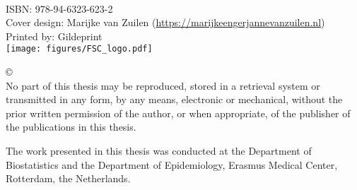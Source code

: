 \frontmatter

\thispagestyle{empty}

\begin{center}
  \vspace*{0.5cm}
  {
   \fontsize{16}{22}\selectfont{
   \thetitle}\\[1.05ex]
  }

  \vspace{14cm}
  {
   \fontsize{14}{16}\selectfont\par\vspace*{0.5cm}
   {\shortauthor}
  }
\end{center}
\vfill
\pagebreak



\thispagestyle{empty}

\phantom{\ }

\vfill

\begin{flushleft}
\setlength\tabcolsep{0pt}

ISBN: 978-94-6323-623-2\\
Cover design: Marijke van Zuilen (\url{https://marijkeengerjannevanzuilen.nl})\\
Printed by:   Gildeprint\\[2ex]
\texttt{[image: figures/FSC\_logo.pdf]}

\vspace{0.5cm}

\copyright\ \thedate\ \shortauthor\\[1.05ex]
No part of this thesis may be reproduced, stored in a retrieval system or
transmitted in any form, by any means, electronic or mechanical, without the
prior written permission of the author, or when appropriate, of the publisher
of the publications in this thesis.\\

\vspace{0.5cm}

The work presented in this thesis was conducted at the Department of
Biostatistics and the Department of Epidemiology, Erasmus Medical Center,
Rotterdam, the Netherlands.
\end{flushleft}

\newpage
\thispagestyle{empty}
\newlength{\akcolwidth}
\setlength{\akcolwidth}{12.5cm}
\newcommand{\promfont}[1]{\usefont{OT1}{phv}{c}{n}\fontsize{10}{12}\selectfont#1}
\newcommand{\npromfont}[1]{\usefont{OT1}{phv}{c}{n}\fontsize{10}{12}\selectfont#1}
\newcommand{\indfont}[1]{\usefont{OT1}{phv}{c}{n}\fontsize{10}{12}\selectfont#1}

